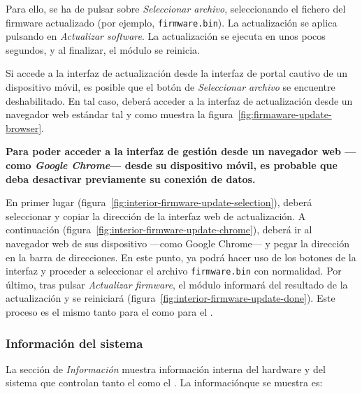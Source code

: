 Para ello, se ha de pulsar sobre \emph{Seleccionar archivo}, seleccionando el fichero del firmware actualizado (por ejemplo, \texttt{firmware.bin}). La actualización se aplica pulsando en \emph{Actualizar software}. La actualización se ejecuta en unos pocos segundos, y al finalizar, el módulo se reinicia.


Si accede a la interfaz de actualización desde la interfaz de portal cautivo de un dispositivo móvil, es posible que el botón de \emph{Seleccionar archivo} se encuentre deshabilitado. En tal caso, deberá acceder a la interfaz de actualización desde un navegador web estándar tal y como muestra la figura~\ref{fig:firmaware-update-browser}.


\textbf{Para poder acceder a la interfaz de gestión desde un navegador web ---como \textit{Google Chrome}--- desde su dispositivo móvil, es probable que deba desactivar previamente su conexión de datos.}


En primer lugar (figura~\ref{fig:interior-firmware-update-selection}), deberá seleccionar y copiar la dirección de la interfaz web de actualización. A continuación (figura~\ref{fig:interior-firmware-update-chrome}), deberá ir al navegador web de sus dispositivo ---como Google Chrome--- y pegar la dirección en la barra de direcciones. En este punto, ya podrá hacer uso de los botones de la interfaz y proceder a seleccionar el archivo \texttt{firmware.bin} con normalidad. Por último, tras pulsar \emph{Actualizar firmware}, el módulo informará del resultado de la actualización y se reiniciará (figura~\ref{fig:interior-firmware-update-done}). Este proceso es el mismo tanto para el \MIE como para el \MEE.
\attend

\subsubsection{Información del sistema}
\label{sec:info}

La sección de \emph{Información} muestra información interna del hardware y del sistema que controlan tanto el \MIE como el \MEE. La informaciónque se muestra es:



